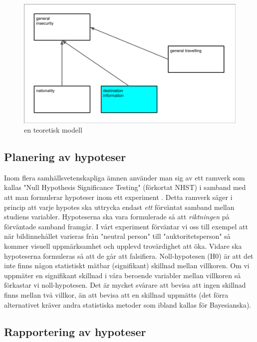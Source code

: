 \documentclass[
]{book}
\begin{document}
\begin{figure}

{\centering \includegraphics[width=0.8\linewidth]{../fig/model} 

}

\caption{en teoretisk modell}\label{fig:img-model}
\end{figure}

\hypertarget{sub06.3.1}{%
\subsection{Planering av hypoteser}\label{sub06.3.1}}

Inom flera samhällsvetenskapliga ämnen använder man sig av ett ramverk som kallas "Null Hypothesis Significance Testing" (förkortat NHST) i samband med att man formulerar hypoteser inom ett experiment \citep{pernet2015null}. Detta ramverk säger i princip att varje hypotes ska uttrycka endast \emph{ett} förväntat samband mellan studiens variabler. Hypoteserna ska vara formulerade så att \emph{riktningen} på förväntade samband framgår. I vårt experiment förväntar vi oss till exempel att när bildinnehållet varieras från "neutral person" till "auktoritetsperson" så kommer visuell uppmärksamhet och upplevd trovärdighet att öka. Vidare ska hypoteserna formuleras så att de går att falsifiera. Noll-hypotesen (H0) är att det inte finns någon statistiskt mätbar (signifikant) skillnad mellan villkoren. Om vi uppmäter en signifikant skillnad i våra beroende variabler mellan villkoren så förkastar vi noll-hypotesen. Det är mycket svårare att bevisa att ingen skillnad finns mellan två villkor, än att bevisa att en skillnad uppmätts (det förra alternativet kräver andra statistiska metoder som ibland kallas för Bayesianska).

\hypertarget{sub06.3.2}{%
\subsection{Rapportering av hypoteser}\label{sub06.3.2}}
\end{document}
